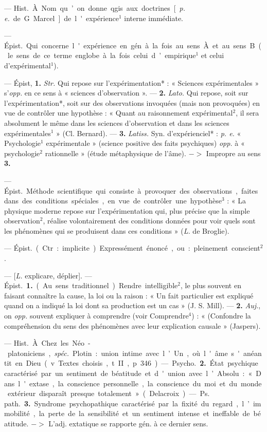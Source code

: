 \begin{itemize}[leftmargin=1cm, label=, itemsep=1pt]
 — \si{Hist.} À. Nom
qu’on donne qgis. aux doctrines
[{\it p. e.} de G. Marcel] de l'expérience$^1$
interne immédiate.

 — \si{Épist.}
Qui concerne l'expérience en gén. à
la fois au sens À et au sens B (le sens
de ce terme englobe à la fois celui
d’empirique$^1$ et celui d'expérimental$^1$).

 — Épist, {\bf 1.} {\it Str.} Qui
repose sur l’expérimentation* :
« Sciences expérimentales » s’{\it opp.}
en ce sens à « sciences d’observation ». — {\bf 2.} {\it Lato.} Qui repose, soit
sur l’expérimentation*, soit sur des
observations invoquées (mais non
provoquées) en vue de contrôler une
hypothèse : « Quant au raisonnement
expérimental$^2$, il sera absolument le même dans les sciences
d'observation et dans les sciences
expérimentales$^1$ » (Cl. Bernard). —
 {\bf 3.} {\it Latiss.} Syn. d'expérienciel* : {\it p. e.}
« Psychologie$^1$ expérimentale »
(science positive des faits psychiques) {\it opp.} à « psychologie$^2$ rationnelle » (étude métaphysique de
l'âme). $->$ Impropre au sens {\bf 3.}

 — \si{Épist.} Méthode
scientifique qui consiste à provoquer
des observations, faites dans des conditions spéciales, en vue de contrôler
une hypothèse$^3$ : « La physique
moderne repose sur l'expérimentation qui, plus précise que la
simple observation$^2$, réalise volontairement des conditions données
pour voir quels sont les phénomènes
qui se produisent dans ces conditions » ({\it L.} de Broglie).

 — \si{Épist.} (Ctr. : implicite).
Expressément énoncé, ou : pleinement conscient$^2$.

 — [{\it L.} explicare, déplier]. —
\si{Épist.} {\bf 1.} (Au sens traditionnel).
Rendre intelligible$^2$, le plus souvent
en faisant connaître la cause, la loi
ou la raison : « Un fait particulier est
expliqué quand on a indiqué la loi
dont sa production est un cas »
(J. S. Mill). — {\bf 2.} {\it Auj.}, on {\it opp.} souvent expliquer à comprendre (voir
Comprendre$^4$) : « (Confondre la
compréhension du sens des phénomènes avec leur explication causale »
(Jaspers).

 — \si{Hist.} À. Chez les Néo-platoniciens, {\it spéc.} Plotin : union intime
avec l’Un, où l'âme s'anéantit en
Dieu (v. Textes choisis, t. II, p. 346).
— \si{Psycho.} {\bf 2.} État psychique caractérisé par un sentiment de béatitude
et d'union avec l’Absolu : « Dans
l'extase, la conscience personnelle,
la conscience du moi et du monde
extérieur disparaît presque totalement » (Delacroix). — \si{Ps. path.}
 {\bf 3.} Syndrome psychopathique caractérisé par la fixité du regard, l’immobilité, la perte de la sensibilité
et un sentiment intense et ineffable
de béatitude. $->$ L'adj. extatique
se rapporte gén. à ce dernier sens.


\end{itemize}
